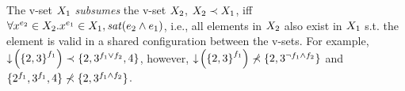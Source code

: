 %
\begin{definition} 
\label{def:vset-subsumption}
The v-set \ensuremath{\vset_1} \emph {subsumes} the v-set
\ensuremath{\vset_2}, $\subsume {\vset_2} {\vset_1}$, iff
\ensuremath{ \forall \annot [\dimMeta_2] \elem \in \vset_2.
\annot [\dimMeta_1] \elem \in \vset_1, 
\sat {\dimMeta_2 \wedge  \dimMeta_1}
},
i.e., all elements in $\vset_2$ also exist in $\vset_1$ 
s.t. the element is valid in a shared configuration between the v-sets.
For example, 
\ensuremath{
 \subsume {\pushIn {\annot [\A] {\setDef {2,3}}}} {\setDef {2, \annot [\A \vee \B] 3, 4}}},
however, 
\ensuremath{
 \nsubsume {\pushIn {\annot [\A] {\setDef {2,3}}}} {\setDef {2, \annot [\neg \A \wedge \B] 3}}}
and
\ensuremath{
\nsubsume {\setDef {\annot [\A] 2,\annot [\A] 3, 4}} {\setDef {2, \annot [\A \wedge \B] 3}}}.
\end{definition}





